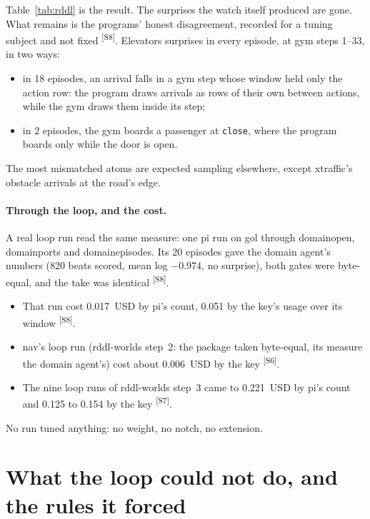 \documentclass[11pt]{article}
\newcommand{\tool}[1]{{\ttfamily\begingroup\def\_{\textunderscore\allowbreak}#1\endgroup}}
\newcommand{\src}[1]{\textsuperscript{[#1]}}
\begin{document}
Table~\ref{tab:rddl} is the result. The surprises the watch itself
produced are gone. What remains is the programs' honest disagreement,
recorded for a tuning subject and not fixed \src{S8}. Elevators surprises
in every episode, at gym steps 1--33, in two ways:
\begin{itemize}[nosep]
\item in 18 episodes, an arrival falls in a gym step whose window held only
  the action row: the program draws arrivals as rows of their own between
  actions, while the gym draws them inside its step;
\item in 2 episodes, the gym boards a passenger at \texttt{close}, where
  the program boards only while the door is open.
\end{itemize}
The most mismatched atoms are expected sampling elsewhere, except
xtraffic's obstacle arrivals at the road's edge.

\paragraph{Through the loop, and the cost.} A real loop run read the
same measure: one pi run on gol through \tool{domain\_open},
\tool{domain\_ports} and \tool{domain\_episodes}. Its 20 episodes gave the
domain agent's numbers (820 beats scored, mean log $-0.974$, no surprise),
both gates were byte-equal, and the take was identical \src{S8}.
\begin{itemize}[nosep]
\item That run cost 0.017~USD by pi's count, 0.051 by the key's usage over
  its window \src{S8}.
\item nav's loop run (rddl-worlds step~2: the package taken byte-equal,
  its measure the domain agent's) cost about 0.006~USD by the key \src{S6}.
\item The nine loop runs of rddl-worlds step~3 came to 0.221~USD by pi's
  count and 0.125 to 0.154 by the key \src{S7}.
\end{itemize}
No run tuned anything: no weight, no notch, no extension.

\section{What the loop could not do, and the rules it forced}\label{sec:limits}
\end{document}
